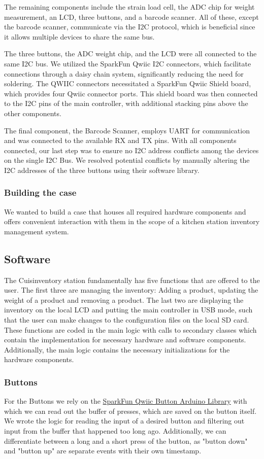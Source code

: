 \documentclass{article}
\begin{document}
The remaining components include the strain load cell, the ADC chip for weight measurement, an LCD, three buttons, and a barcode scanner. All of these, except the barcode scanner, communicate via the I2C protocol, which is beneficial since it allows multiple devices to share the same bus.

The three buttons, the ADC weight chip, and the LCD were all connected to the same I2C bus. We utilized the SparkFun Qwiic I2C connectors, which facilitate connections through a daisy chain system, significantly reducing the need for soldering. The QWIIC connectors necessitated a SparkFun Qwiic Shield board, which provides four Qwiic connector ports. This shield board was then connected to the I2C pins of the main controller, with additional stacking pins above the other components.

The final component, the Barcode Scanner, employs UART for communication and was connected to the available RX and TX pins. With all components connected, our last step was to ensure no I2C address conflicts among the devices on the single I2C Bus. We resolved potential conflicts by manually altering the I2C addresses of the three buttons using their software library.

\subsubsection{Building the case}
We wanted to build a case that houses all required hardware components and offers convenient interaction with them in the scope of a kitchen station inventory management system.
\subsection{Software}
The Cuisinventory station fundamentally has five functions that are offered to the user. The first three are managing the inventory: Adding a product, updating the weight of a product and removing a product.
The last two are displaying the inventory on the local LCD and putting the main controller in USB mode, such that the user can make changes to the configuration files on the local SD card.
These functions are coded in the main logic with calls to secondary classes which contain the implementation for necessary hardware and software components.
Additionally, the main logic contains the necessary initializations for the hardware components.
\subsubsection{Buttons}
For the Buttons we rely on the \href{https://github.com/sparkfun/SparkFun_Qwiic_Button_Arduino_Library}{SparkFun Qwiic Button Arduino Library} with which we can read out the buffer of presses, which are saved on the button itself.
We wrote the logic for reading the input of a desired button and filtering out input from the buffer that happened too long ago.
Additionally, we can differentiate between a long and a short press of the button, as "button down" and "button up" are separate events with their own timestamp.
\end{document}
